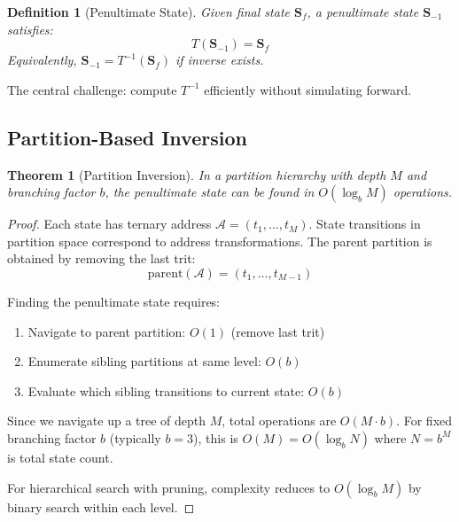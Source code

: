 \documentclass[twocolumn,10pt]{article}
\newtheorem{theorem}{Theorem}
\newtheorem{definition}{Definition}
\begin{document}
\begin{definition}[Penultimate State]
Given final state $\mathbf{S}_f$, a penultimate state $\mathbf{S}_{-1}$ satisfies:
\begin{equation}
T(\mathbf{S}_{-1}) = \mathbf{S}_f
\end{equation}
Equivalently, $\mathbf{S}_{-1} = T^{-1}(\mathbf{S}_f)$ if inverse exists.
\end{definition}

The central challenge: compute $T^{-1}$ efficiently without simulating forward.

\subsection{Partition-Based Inversion}

\begin{theorem}[Partition Inversion]
\label{thm:partition_inversion}
In a partition hierarchy with depth $M$ and branching factor $b$, the penultimate state can be found in $O(\log_b M)$ operations.
\end{theorem}

\begin{proof}
Each state has ternary address $\mathcal{A} = (t_1, \ldots, t_M)$. State transitions in partition space correspond to address transformations. The parent partition is obtained by removing the last trit:
\begin{equation}
\text{parent}(\mathcal{A}) = (t_1, \ldots, t_{M-1})
\end{equation}

Finding the penultimate state requires:
\begin{enumerate}
\item Navigate to parent partition: $O(1)$ (remove last trit)
\item Enumerate sibling partitions at same level: $O(b)$
\item Evaluate which sibling transitions to current state: $O(b)$
\end{enumerate}

Since we navigate up a tree of depth $M$, total operations are $O(M \cdot b)$. For fixed branching factor $b$ (typically $b = 3$), this is $O(M) = O(\log_b N)$ where $N = b^M$ is total state count.

For hierarchical search with pruning, complexity reduces to $O(\log_b M)$ by binary search within each level.
\end{proof}
\end{document}
